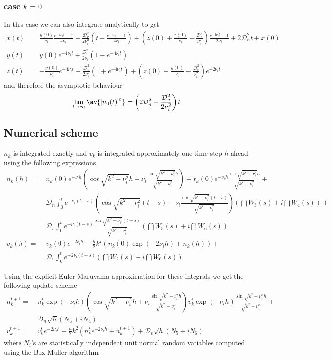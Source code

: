 \documentclass[10pt,a4paper]{article}
\newcommand{\src}{\ensuremath{\mathcal{D}}}
\def\knui{\sqrt{k^2{-}\nu_i^2}}
\begin{document}
\subsubsection{case $k=0$}
In this case we can also integrate analytically to get
\begin{align}
x(t)&=\frac{y(0)}{\nu_i}\frac{e^{-4\nu_it}{-}1}{4\nu_i}+
\frac{\src_v^2}{2\nu_i^2}
\left(t+\frac{e^{-4\nu_it}{-}1}{4\nu_i}\right)+
\left(z(0){+}\frac{y(0)}{\nu_i}{-}
\frac{\src_v^2}{\nu_i^2}\right)\frac{e^{-2\nu_it}{-}1}{2\nu_i}
+2\src_n^2t+x(0)\label{eq:sde2akn01}\\
y(t) &= y(0)e^{-4\nu_it}+
\frac{\src_v^2}{2\nu_i}\left(1{-}e^{-4\nu_it}\right)
\label{eq:sde2akn02}\\
z(t) &= -\frac{y(0)}{\nu_i}e^{-4\nu_it}+
\frac{\src_v^2}{2\nu_i^2}\left(1+e^{-4\nu_it}\right)+
\left(z(0)+\frac{y(0)}{\nu_i}-\frac{\src_v^2}{\nu_i^2}\right)e^{-2\nu_it}
\end{align}
and therefore the asymptotic behaviour
\begin{align}
\lim_{t\rightarrow\infty} \av{|n_0(t)|^2} =
\left(2\src_n^2+\frac{\src_v^2}{2\nu_i^2}\right)t
\end{align}


\subsection{Numerical scheme}

$n_k$ is integrated exactly and $v_k$ is integrated approximately  one time step $h$ ahead using
the following expressions
\begin{align}
n_k(h)=&\;n_k(0)e^{-\nu_ih}\left(\cos\knui h+
\nu_i\frac{\sin\knui h}{\knui}\right)+
v_k(0)e^{-\nu_ih}\frac{\sin\knui h}{\knui}+\nonumber\\
&\;\src_n\int_0^te^{-\nu_i(t{-}s)}
\left(\cos\knui(t{-}s) +\nu_i\frac{\sin\knui(t{-}s)}{\knui}\right)
\left(\dint{W_3(s)}+i\dint{W_4(s)}\right)+\nonumber\\
&\;\src_v\int_0^te^{-\nu_i(t{-}s)}
\frac{\sin\knui(t{-}s)}{\knui}\left(\dint{W_5(s)}+i\dint{W_6(s)}\right)\label{eq:sde20i}\\
v_k(h)=&\;v_k(0)e^{-2\nu_ih}-\frac{h}{2}k^2\left(n_k(0)
\exp(-2\nu_ih)+n_k(h)\right)+\nonumber\\
&\;\src_v\int_0^te^{-2\nu_i(t{-}s)}
\left(\dint{W_5(s)}+i\dint{W_6(s)}\right)
\label{eq:sde21i}
\end{align}

Using the explicit Euler-Maruyama approximation for these integrals we get the following 
update scheme  
\begin{align}
n_k^{t+1}=&\;n_k^t\exp(-\nu_ih)\left(\cos\knui h+
\nu_i\frac{\sin\knui h}{\knui}\right)
v_k^t\exp(-\nu_ih)\frac{\sin\knui h}{\knui}+\nonumber\\
&\;\src_n\sqrt{h}\left(N_3+iN_4\right)
\label{eq:sde20num}\\
v_k^{t+1}=&\;v_k^t e^{-2\nu_ih}-\frac{h}{2}k^2\left(n_k^t
e^{-2\nu_ih}+n_k^{t+1}\right)+\src_v\sqrt{h}\left(N_5+iN_6\right)
\label{eq:sde21num}
\end{align}
where $N_i$'s are statistically independent unit normal random variables computed using the
Box-Muller algorithm.
\end{document}
